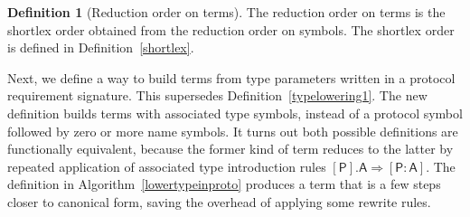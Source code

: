 \documentclass[a4paper,headsepline,bibliography=totoc,toc=flat,fleqn,twoside=semi]{scrbook}
\theoremstyle{definition}
\newtheorem{definition}{Definition}[chapter]
\theoremstyle{definition}
\theoremstyle{definition}
\newcommand{\namesym}[1]{\mathsf{#1}}
\newcommand{\proto}[1]{\bm{\mathsf{#1}}}
\newcommand{\protosym}[1]{[\proto{#1}]}
\newcommand{\assocsym}[2]{[\proto{#1}\colon\namesym{#2}]}
\begin{document}
\begin{definition}[Reduction order on terms]
The reduction order on terms is the shortlex order obtained from the reduction order on symbols. The shortlex order is defined in Definition~\ref{shortlex}.
\end{definition}

Next, we define a way to build terms from type parameters written in a protocol requirement signature. This supersedes Definition~\ref{typelowering1}. The new definition builds terms with associated type symbols, instead of a protocol symbol followed by zero or more name symbols. It turns out both possible definitions are functionally equivalent, because the former kind of term reduces to the latter by repeated application of associated type introduction rules $\protosym{P}.\namesym{A}\Rightarrow\assocsym{P}{A}$. The definition in Algorithm~\ref{lowertypeinproto} produces a term that is a few steps closer to canonical form, saving the overhead of applying some rewrite rules.
\end{document}
